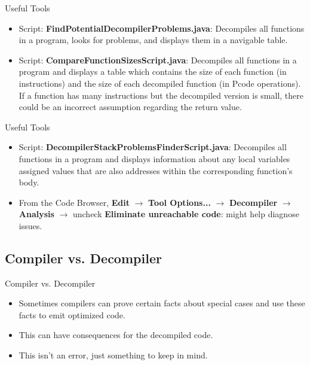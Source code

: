 \documentclass{beamer}
\begin{document}
\begin{frame}
\begin{block}{Useful Tools}
\begin{itemize}
\item Script: \textbf{FindPotentialDecompilerProblems.java}: Decompiles all functions in a program, looks for problems, and displays them in a navigable table.
\item Script: \textbf{CompareFunctionSizesScript.java}: Decompiles all functions in a program and displays a table which contains the size of each function 
(in instructions) and the size of each decompiled function (in Pcode operations). If a function has many instructions but the decompiled version is small, 
there could be an incorrect assumption regarding the return value.
\end{itemize}
\end{block}
\end{frame}


\begin{frame}
\begin{block}{Useful Tools}
\begin{itemize}
\item Script: \textbf{DecompilerStackProblemsFinderScript.java}: Decompiles all functions in a program and displays information about any local variables assigned
values that are also addresses within the corresponding function's body.
\item From the Code Browser, \textbf{Edit} $\rightarrow$ \textbf{Tool Options...} $\rightarrow$ \textbf{Decompiler} $\rightarrow$ \textbf{Analysis} 
$\rightarrow$ uncheck \textbf{Eliminate unreachable code}: might help diagnose issues.
\end{itemize}
\end{block}
\end{frame}


\subsection{Compiler vs. Decompiler}
\begin{frame}
\begin{block}{Compiler vs. Decompiler}
\begin{itemize}
\item Sometimes compilers can prove certain facts about special cases and use these facts to emit optimized code.
\item This can have consequences for the decompiled code.
\item This isn't an error, just something to keep in mind. 
\end{itemize}
\end{block}
\end{frame}
\end{document}
